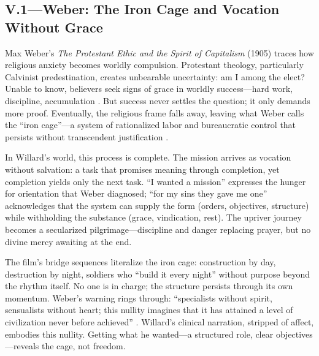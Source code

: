 \subsection*{V.1—Weber: The Iron Cage and Vocation Without Grace}
\label{ssec:v-weber}
Max Weber's \textit{The Protestant Ethic and the Spirit of Capitalism} (1905) traces how
religious anxiety becomes worldly compulsion. Protestant theology, particularly Calvinist
predestination, creates unbearable uncertainty: am I among the elect? Unable to know, believers
seek signs of grace in worldly success---hard work, discipline, accumulation
\parencite{WeberProtestant2002}. But success never settles the question; it only demands more
proof. Eventually, the religious frame falls away, leaving what Weber calls the ``iron
cage''---a system of rationalized labor and bureaucratic control that persists without
transcendent justification \parencite{WeberProtestant2002}.

In Willard's world, this process is complete. The mission arrives as vocation without
salvation: a task that promises meaning through completion, yet completion yields only the next
task. ``I wanted a mission'' expresses the hunger for orientation that Weber diagnosed; ``for
my sins they gave me one'' acknowledges that the system can supply the form (orders,
objectives, structure) while withholding the substance (grace, vindication, rest). The upriver
journey becomes a secularized pilgrimage---discipline and danger replacing prayer, but no
divine mercy awaiting at the end.

The film's bridge sequences literalize the iron cage: construction by day, destruction by
night, soldiers who ``build it every night'' without purpose beyond the rhythm itself. No one
is in charge; the structure persists through its own momentum. Weber's warning rings through:
``specialists without spirit, sensualists without heart; this nullity imagines that it has
attained a level of civilization never before achieved'' \parencite{WeberProtestant2002}.
Willard's clinical narration, stripped of affect, embodies this nullity. Getting what he
wanted---a structured role, clear objectives---reveals the cage, not freedom.
